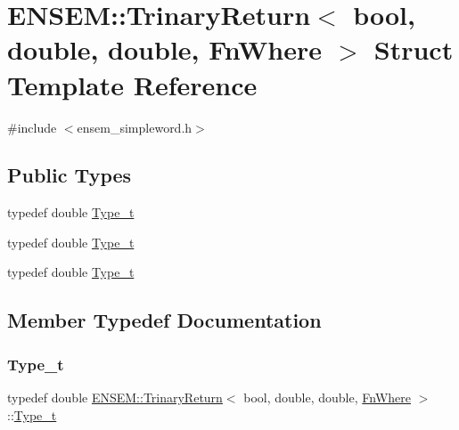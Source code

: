 \hypertarget{structENSEM_1_1TrinaryReturn_3_01bool_00_01double_00_01double_00_01FnWhere_01_4}{}\section{E\+N\+S\+EM\+:\+:Trinary\+Return$<$ bool, double, double, Fn\+Where $>$ Struct Template Reference}
\label{structENSEM_1_1TrinaryReturn_3_01bool_00_01double_00_01double_00_01FnWhere_01_4}


{\ttfamily \#include $<$ensem\+\_\+simpleword.\+h$>$}

\subsection*{Public Types}
\begin{DoxyCompactItemize}
\item 
typedef double \mbox{\hyperlink{structENSEM_1_1TrinaryReturn_3_01bool_00_01double_00_01double_00_01FnWhere_01_4_a9a6eb2e23b53eb2cd6021511101cd3a1}{Type\+\_\+t}}
\item 
typedef double \mbox{\hyperlink{structENSEM_1_1TrinaryReturn_3_01bool_00_01double_00_01double_00_01FnWhere_01_4_a9a6eb2e23b53eb2cd6021511101cd3a1}{Type\+\_\+t}}
\item 
typedef double \mbox{\hyperlink{structENSEM_1_1TrinaryReturn_3_01bool_00_01double_00_01double_00_01FnWhere_01_4_a9a6eb2e23b53eb2cd6021511101cd3a1}{Type\+\_\+t}}
\end{DoxyCompactItemize}


\subsection{Member Typedef Documentation}
\mbox{\label{structENSEM_1_1TrinaryReturn_3_01bool_00_01double_00_01double_00_01FnWhere_01_4_a9a6eb2e23b53eb2cd6021511101cd3a1}} 
\subsubsection{\texorpdfstring{Type\_t}{Type\_t}\hspace{0.1cm}{\footnotesize\ttfamily [1/3]}}
{\footnotesize\ttfamily typedef double \mbox{\hyperlink{structENSEM_1_1TrinaryReturn}{E\+N\+S\+E\+M\+::\+Trinary\+Return}}$<$ bool, double, double, \mbox{\hyperlink{structENSEM_1_1FnWhere}{Fn\+Where}} $>$\+::\mbox{\hyperlink{structENSEM_1_1TrinaryReturn_3_01bool_00_01double_00_01double_00_01FnWhere_01_4_a9a6eb2e23b53eb2cd6021511101cd3a1}{Type\+\_\+t}}}

